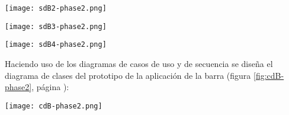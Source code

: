   \begin{sidewaysfigure}[h]
    \begin{center}
      \texttt{[image: sdB2-phase2.png]}
      \caption{Diagrama de secuencia del caso de uso \emph{añadir un nuevo
      pedido (manual)}.}
      \label{fig:sdB2-phase2}
    \end{center}
  \end{sidewaysfigure}

  \begin{sidewaysfigure}[h]
    \begin{center}
      \texttt{[image: sdB3-phase2.png]}
      \caption{Diagrama de secuencia del caso de uso \emph{actualizar
      estado de un pedido} de \emph{No atendido} a \emph{Servido}.}
      \label{fig:sdB3-phase2}
    \end{center}
  \end{sidewaysfigure}

  \begin{sidewaysfigure}[h]
    \begin{center}
      \texttt{[image: sdB4-phase2.png]}
      \caption{Diagrama de secuencia del caso de uso \emph{generar factura}
      y \emph{cobrar importe total}.}
      \label{fig:sdB4-phase2}
    \end{center}
  \end{sidewaysfigure}

Haciendo uso de los diagramas de casos de uso y de secuencia se
diseña el diagrama de clases del prototipo de la aplicación de la barra
(figura \ref{fig:cdB-phase2}, página \pageref{fig:cdB-phase2}):

  \begin{sidewaysfigure}[h]
    \begin{center}
      \texttt{[image: cdB-phase2.png]}
      \caption{Diagrama de clases del prototipo de la aplicación de la barra
      (Fase 3).}
      \label{fig:cdB-phase2}
    \end{center}
  \end{sidewaysfigure}


